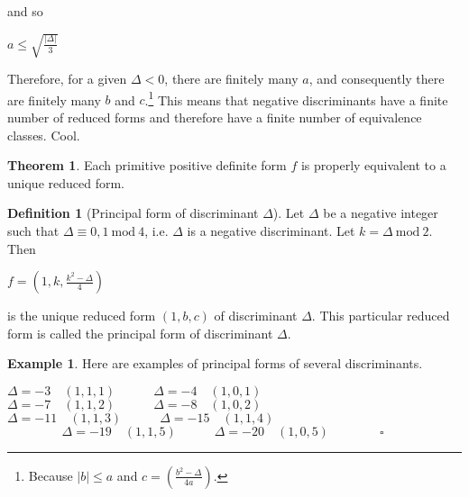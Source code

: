 \documentclass{article}
\theoremstyle{definition}
\newtheorem{definition}{Definition}[section]
\theoremstyle{theorem}
\newtheorem{theorem}{Theorem}[section]
\theoremstyle{example}
\newtheorem{example}{Example}[section]
\theoremstyle{corollary}
\begin{document}
and so

\begin{center}
\(a \le \sqrt{\frac{|\Delta |}{3}}\)
\end{center}

\bigskip

Therefore, for a given \(\Delta < 0\), there are finitely many \(a\), and consequently there are finitely many \(b\) and \(c\).\footnote{Because \(|b| \le a\) and \(c = \left( \frac{b^{2} - \Delta}{4a}\right)\).} This means that negative discriminants have a finite number of reduced forms and therefore have a finite number of equivalence classes. Cool.

\bigskip

\theoremstyle{theorem}
\begin{theorem}
Each primitive positive definite form \(f\) is properly equivalent to a unique reduced form.
\end{theorem}

\bigskip

\theoremstyle{definition}
\begin{definition}[Principal form of discriminant \(\Delta\)]
Let \(\Delta\) be a negative integer such that \(\Delta \equiv 0, 1 \ \textrm{mod} \ 4\), i.e. \(\Delta\) is a negative discriminant. Let \(k = \Delta \ \textrm{mod} \ 2\). Then
\begin{center}
\(f = \left(1, k, \frac{k^{2} - \Delta}{4}\right)\)
\end{center}
is the unique reduced form \((1, b, c)\) of discriminant \(\Delta\). This particular reduced form is called the principal form of discriminant \(\Delta\).
\end{definition}

\bigskip

\theoremstyle{example}
\begin{example}
Here are examples of principal forms of several discriminants.
\begin{center}
\(\Delta = -3 \quad (1, 1, 1) \quad \quad \quad \Delta = -4 \quad (1, 0, 1)\) \\
\(\Delta = -7 \quad (1, 1, 2) \quad \quad \quad \Delta = -8 \quad (1, 0, 2)\) \\
\(\Delta = -11 \quad (1, 1, 3) \quad \quad \quad \Delta = -15 \quad (1, 1, 4)\) \\
\(\phantom{\quad \quad \quad \quad \square} \Delta = -19 \quad (1, 1, 5) \quad \quad \quad \Delta = -20 \quad (1, 0, 5) \quad \quad \quad \quad \square\)
\end{center}
\end{example}
\end{document}
